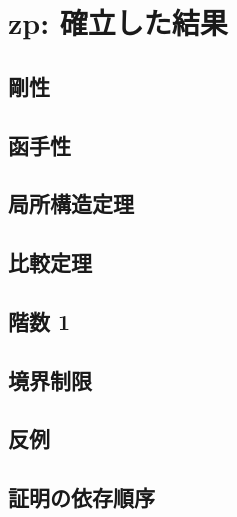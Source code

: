 
\section{zp: 確立した結果}

\subsection{剛性}

\subsection{函手性}

\subsection{局所構造定理}

\subsection{比較定理}

\subsection{階数 1}

\subsection{境界制限}

\subsection{反例}

\subsection{証明の依存順序}
